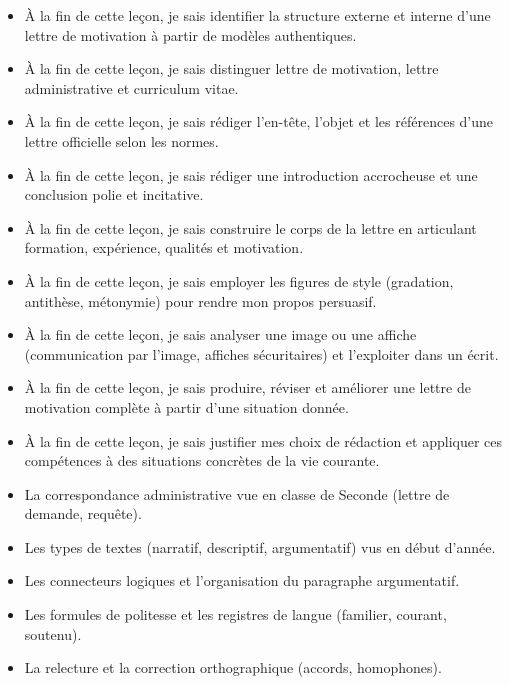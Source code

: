 \documentclass[11pt]{article}
\begin{document}
\begin{objectifs}
\begin{itemize}
\item À la fin de cette leçon, je sais identifier la structure externe et interne d'une lettre de motivation à partir de modèles authentiques.
\item À la fin de cette leçon, je sais distinguer lettre de motivation, lettre administrative et curriculum vitae.
\item À la fin de cette leçon, je sais rédiger l'en-tête, l'objet et les références d'une lettre officielle selon les normes.
\item À la fin de cette leçon, je sais rédiger une introduction accrocheuse et une conclusion polie et incitative.
\item À la fin de cette leçon, je sais construire le corps de la lettre en articulant formation, expérience, qualités et motivation.
\item À la fin de cette leçon, je sais employer les figures de style (gradation, antithèse, métonymie) pour rendre mon propos persuasif.
\item À la fin de cette leçon, je sais analyser une image ou une affiche (communication par l'image, affiches sécuritaires) et l'exploiter dans un écrit.
\item À la fin de cette leçon, je sais produire, réviser et améliorer une lettre de motivation complète à partir d'une situation donnée.
\item À la fin de cette leçon, je sais justifier mes choix de rédaction et appliquer ces compétences à des situations concrètes de la vie courante.
\end{itemize}
\end{objectifs}

\begin{prerequis}
\begin{itemize}
\item La correspondance administrative vue en classe de Seconde (lettre de demande, requête).
\item Les types de textes (narratif, descriptif, argumentatif) vus en début d'année.
\item Les connecteurs logiques et l'organisation du paragraphe argumentatif.
\item Les formules de politesse et les registres de langue (familier, courant, soutenu).
\item La relecture et la correction orthographique (accords, homophones).
\end{itemize}
\end{prerequis}
\end{document}
